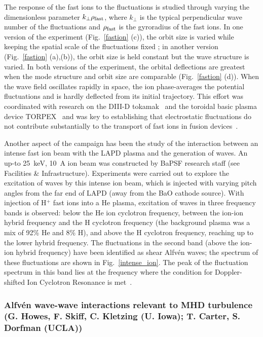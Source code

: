 \documentclass[11pt]{article}
\renewcommand{\cite}{\citep}
\begin{document}
The response of the fast ions to the fluctuations is studied through
varying the dimensionless parameter $k_\perp \rho_{\rm fast}$, where
$k_\perp$ is the typical perpendicular wave number of the fluctuations
and $\rho_{\rm fast}$ is the gyroradius of the fast ions.  
In one version of the experiment (Fig.~\ref{fastion} (c)), the orbit size is varied
while keeping the spatial scale of the fluctuations fixed ; in another version (Fig.~\ref{fastion} (a),(b)), the
orbit size is held constant but the wave structure is varied.  In both
versions of the experiment, the orbital deflections are greatest when
the mode structure and orbit size are comparable (Fig.~\ref{fastion} (d)).  When
the wave field oscillates rapidly in space, the ion phase-averages the potential
fluctuations and is hardly deflected from its initial trajectory.
This effort was coordinated with research on the DIII-D tokamak~\cite{pace:2013} and
the toroidal basic plasma device TORPEX~\cite{heidbrink:2012,bovet:2012} and was key to establishing
that electrostatic fluctuations do not contribute substantially to the
transport of fast ions in fusion devices~\cite{pace:2013}.

Another aspect of the campaign has been the study of the interaction
between an intense fast ion beam with the LAPD plasma and the
generation of waves.  An up-to 25~keV, 10~A ion beam was constructed
by BaPSF research staff (see Facilities \& Infrastructure).
Experiments were carried out to explore the excitation of waves by
this intense ion beam, which is injected with varying pitch angles
from the far end of LAPD (away from the BaO cathode source).  With
injection of H$^+$ fast ions into a He plasma, excitation of waves in
three frequency bands is observed:  below the He ion cyclotron
frequency, between the ion-ion hybrid frequency and the H cyclotron
frequency (the background plasma was a mix of 92\% He and 8\% H), and
above the H cyclotron frequency, reaching up to the lower hybrid
frequency.  The fluctuations in the second band (above the ion-ion
hybrid frequency) have been identified as shear Alfv\'{e}n waves; the
spectrum of these fluctuations are shown in Fig.~\ref{intense_ion}.
The peak of the fluctuation spectrum in this band lies at the
frequency where the condition for Doppler-shifted Ion Cyclotron
Resonance is met~\cite{tripathi:2015}.


\subsubsection{Alfv\'{e}n wave-wave interactions relevant to MHD turbulence (G.
Howes, F. Skiff, C. Kletzing (U. Iowa); T. Carter, S. Dorfman (UCLA))}
\end{document}
